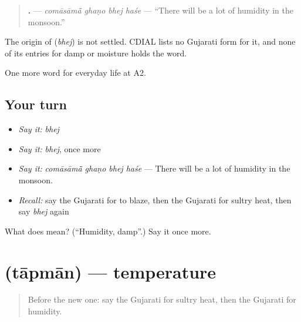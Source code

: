 \begin{quote}
\textbf{   .} — \emph{comāsāmā̃ ghaṇo bhej haśe} — \textquotedblleft{}There will be a lot of humidity in the monsoon.\textquotedblright{}
\end{quote}

\begin{cousinweb}
The origin of \textbf{} (\emph{bhej}) is not settled. CDIAL lists no Gujarati form for it, and none of its entries for damp or moisture holds the word.
\end{cousinweb}

\begin{grammarlens}[title={What you've built}]
One more word for everyday life at A2.
\end{grammarlens}

\subsection*{Your turn}
\begin{itemize}
\raggedright
  \item \emph{Say it:} \emph{bhej}
  \item \emph{Say it:} \emph{bhej}, once more
  \item \emph{Say it:} \emph{comāsāmā̃ ghaṇo bhej haśe} — There will be a lot of humidity in the monsoon.
  \item \emph{Recall:} say the Gujarati for to blaze, then the Gujarati for sultry heat, then say \emph{bhej} again
\end{itemize}

\begin{tcolorbox}[breakable,colback=teal!4,colframe=teal!35!black,title={Before you move on}]
What does  mean? (\textquotedblleft{}Humidity, damp\textquotedblright{}.) Say it once more.
\end{tcolorbox}
\section[\texorpdfstring{\gu{તાપમાન} (tāpmān)}{તાપમાન (tāpmān)}]{ (tāpmān) — temperature}

\label{lesson:GU-C216-tapman}



\begin{quote}
Before the new one: say the Gujarati for sultry heat, then the Gujarati for humidity.
\end{quote}

